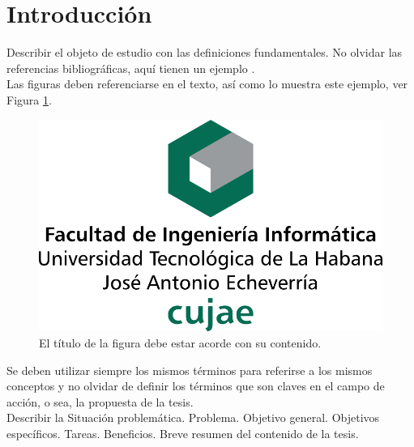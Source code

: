 \chapter*{Introducción}
Describir el objeto de estudio con las definiciones fundamentales. No olvidar las referencias bibliográficas, aquí tienen un ejemplo \citep{pina2019incorporation}.\\

Las figuras deben referenciarse en el texto, así como lo muestra este ejemplo, ver Figura \ref{fig:figCUJAE}.

\begin{figure}[H] %
\centering
  \includegraphics[width=0.5\linewidth]{figuras/membrete-cujae-centrado.png}
  \caption{El título de la figura debe estar acorde con su contenido.}
  \label{fig:figCUJAE} %
\end{figure}

Se deben utilizar siempre los mismos términos para referirse a los mismos conceptos y no olvidar de definir los términos que son claves en el campo de acción, o sea, la propuesta de la tesis.\\

Describir la Situación problemática. Problema. Objetivo general. Objetivos específicos. Tareas. Beneficios. Breve resumen del contenido de la tesis.